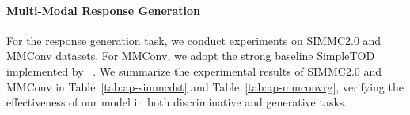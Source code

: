 \documentclass[11pt]{article}
\begin{document}
\begin{table}[t!]
    \centering
    \small
    \caption{
    Multi-modal dialog state tracking performances on MMConv.
    }
    \label{tab:ap-mmconvdst}
\end{table}

\begin{table}[t!]
    \centering
    \small
    \caption{
     Multi-modal dialog state tracking on SIMMC2.0. The evaluation metrics Slot F1 and Act. F1 are used to evaluate the dialog state tracking task, while BLEU is adopted for evaluating response generation. 
    }
    \label{tab:ap-simmcdst}
\end{table}

\paragraph{Multi-Modal Response Generation}
For the response generation task, we conduct experiments on SIMMC2.0 and MMConv datasets.
For MMConv, we adopt the strong baseline SimpleTOD~\citep{hosseini2020simple} implemented by ~\citep{liao2021mmconv}. We summarize the experimental results of  SIMMC2.0 and MMConv in Table~\ref{tab:ap-simmcdst} and Table~\ref{tab:ap-mmconvrg}, verifying the effectiveness of our model in both discriminative and generative tasks.  
\end{document}
